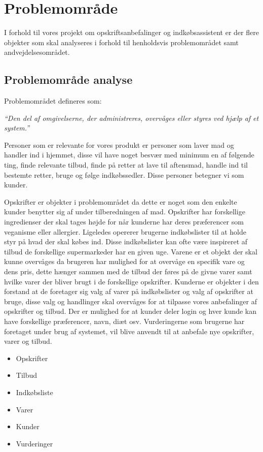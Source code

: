 \chapter{Problemområde}

I forhold til vores projekt om opskriftsanbefalinger og indkøbsassistent er der flere objekter som skal analyseres i forhold til henholdsvis problemområdet samt andvejdelsesområdet.

\section{Problemområde analyse}
Problemområdet defineres som:

\textit{``Den del af omgivelserne, der administreres, overvåges eller styres ved hjælp af et system.''}

Personer som er relevante for vores produkt er personer som laver mad og handler ind i hjemmet, disse vil have noget besvær med minimum en af følgende ting, finde relevante tilbud, finde på retter at lave til aftensmad, handle ind til bestemte retter, bruge og følge indkøbssedler.
Disse personer betegner vi som kunder.

Opskrifter er objekter i problemområdet da dette er noget som den enkelte kunder benytter sig af under tilberedningen af mad.
Opskrifter har forskellige ingredienser der skal tages højde for når kunderne har deres præferencer som veganisme eller allergier.
Ligeledes opererer brugerne indkøbslister til at holde styr på hvad der skal købes ind.
Disse indkøbslister kan ofte være inspireret af tilbud de forskellige supermarkeder har en given uge.
Varene er et objekt der skal kunne overvåges da brugeren har mulighed for at overvåge en specifik vare og dens pris, dette hænger sammen med de tilbud der føres på de givne varer samt hvilke varer der bliver brugt i de forskellige opskrifter.
Kunderne er objekter i den forstand at de foretager sig valg af varer på indkøbslister og valg af opskrifter at bruge, disse valg og handlinger skal overvåges for at tilpasse vores anbefalinger af opskrifter og tilbud.
Der er mulighed for at kunder deler login og hver kunde kan have forskellige præferencer, navn, diæt osv.
Vurderingerne som brugerne har foretaget under brug af systemet, vil blive anvendt til at anbefale nye opskrifter, varer og tilbud.

\begin{itemize}
	\item Opskrifter
	\item Tilbud
	\item Indkøbsliste
	\item Varer
	\item Kunder
	\item Vurderinger
\end{itemize}
